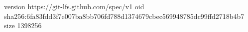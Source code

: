 version https://git-lfs.github.com/spec/v1
oid sha256:6fa83fdd3f7e007ba8bb706fd788d1374679cbec569948785dc99ffd2718b4b7
size 1398256
